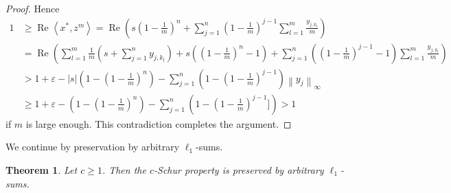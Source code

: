 \documentclass{amsart}
\numberwithin{equation}{section}
\newtheorem{thm}{Theorem}[section]
\theoremstyle{definition}
\def\ep{\varepsilon}
\def\ip#1#2{\left\langle#1,#2\right\rangle}
\newcommand{\norm}[1]{\left\|#1\right\|}
\renewcommand{\Re}{\operatorname{Re}}
\newcommand{\abs}[1]{\left|#1\right|}
\begin{document}
\begin{proof}
Hence
$$\begin{aligned}
 1&\ge \Re \ip{x^*}{z^m} = \Re \left( s(1-\tfrac{1}{m})^n + \sum_{j=1}^n (1-\tfrac1m)^{j-1} \sum_{l=1}^m  \tfrac{y_{j,k_l}}{m}\right) 
 \\&=\Re \left(\sum_{l=1}^m \tfrac1m(s+\sum_{j=1}^n y_{j,k_l})  + s((1-\tfrac1m)^n-1) + \sum_{j=1}^n ((1-\tfrac1m)^{j-1}-1) \sum_{l=1}^m  \tfrac{y_{j,k_l}}{m}\right)
 \\& > 1+\ep - \abs{s}(1-(1-\tfrac1m)^n)- \sum_{j=1}^n (1-(1-\tfrac1m)^{j-1})\norm{y_j}_\infty
 \\&\ge 1+\ep - (1-(1-\tfrac1m)^n)- \sum_{j=1}^n (1-(1-\tfrac1m)^{j-1}]) >1
\end{aligned}$$
if $m$ is large enough. This contradiction completes the argument.



\end{proof}

We continue by preservation by arbitrary $\ell_1$-sums.

\begin{thm}\label{T:ell1suma}
    Let $c\ge 1$. Then the $c$-Schur property is preserved by arbitrary $\ell_1$-sums.
\end{thm}
\end{document}
